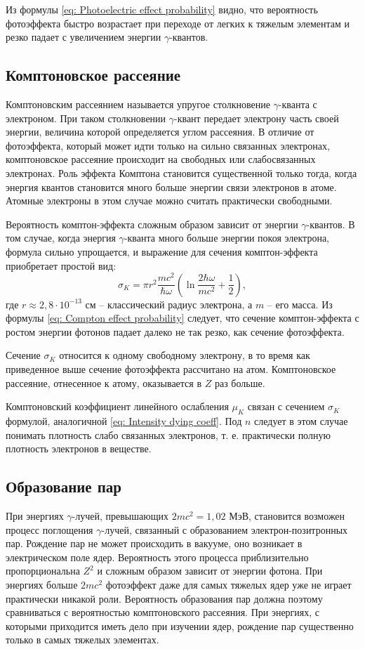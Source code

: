 \documentclass[a4paper,12pt]{article}
\begin{document}
Из формулы \ref{eq: Photoelectric effect probability} видно, что вероятность фотоэффекта быстро возрастает при переходе от легких к тяжелым элементам и резко падает с увеличением энергии $\gamma$-квантов.

\subsection{Комптоновское рассеяние}
Комптоновским рассеянием называется упругое столкновение $\gamma$-кванта с электроном. При таком столкновении $\gamma$-квант передает электрону часть своей энергии, величина которой определяется углом рассеяния. В отличие от фотоэффекта, который может идти только на сильно связанных электронах, комптоновское рассеяние происходит на свободных или слабосвязанных электронах. Роль эффекта Комптона становится существенной только тогда, когда энергия квантов становится много больше энергии связи электронов в атоме. Атомные электроны в этом случае можно считать практически свободными.

Вероятность комптон-эффекта сложным образом зависит от энергии $\gamma$-квантов. В том случае, когда энергия $\gamma$-кванта много больше энергии покоя электрона, формула сильно упрощается, и выражение для сечения комптон-эффекта приобретает простой вид:
\begin{equation}\label{eq: Compton effect probability}
    \sigma_K = \pi r^2\frac{mc^2}{\hbar\omega}\left(\ln\frac{2\hbar\omega}{mc^2} + \frac{1}{2}\right),
\end{equation}
где $r \approx 2,8 \cdot 10^{-13}$ см -- классический радиус электрона, а $m$ -- его масса. Из формулы \ref{eq: Compton effect probability} следует, что сечение комптон-эффекта с ростом энергии фотонов падает далеко не так резко, как сечение фотоэффекта.

Сечение $\sigma_K$ относится к одному свободному электрону, в то время как приведенное выше сечение фотоэффекта рассчитано на атом. Комптоновское рассеяние, отнесенное к атому, оказывается в $Z$ раз больше.

Комптоновский коэффициент линейного ослабления $\mu_K$ связан с сечением $\sigma_K$ формулой, аналогичной \ref{eq: Intensity dying coeff}. Под $n$ следует в этом случае понимать плотность слабо связанных электронов, т. е. практически полную плотность электронов в веществе.

\subsection{Образование пар}
При энергиях $\gamma$-лучей, превышающих $2mc^2 = 1,02$ МэВ, становится возможен процесс поглощения $\gamma$-лучей, связанный с образованием электрон-позитронных пар. Рождение пар не может происходить в вакууме, оно возникает в электрическом поле ядер. Вероятность этого процесса приблизительно пропорциональна $Z^2$ и сложным образом зависит от энергии фотона. При энергиях больше $2mc^2$ фотоэффект даже для самых тяжелых ядер уже не играет практически никакой роли. Вероятность образования пар должна поэтому сравниваться с вероятностью комптоновского рассеяния. При энергиях, с которыми
приходится иметь дело при изучении ядер, рождение пар существенно только в самых тяжелых элементах.
\end{document}
